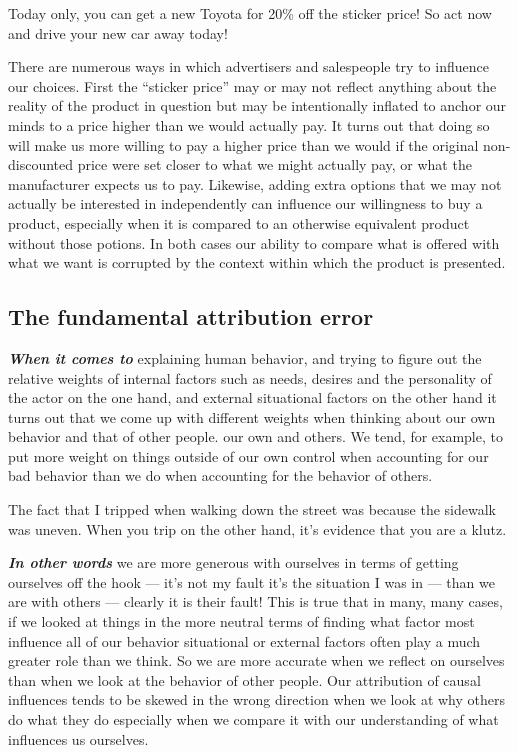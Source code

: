 \documentclass[]{book}
\makeatletter
\newenvironment{kframe}{%
\medskip{}
\setlength{\fboxsep}{.8em}
 \def\at@end@of@kframe{}%
 \ifinner\ifhmode%
  \def\at@end@of@kframe{\end{minipage}}%
  \begin{minipage}{\columnwidth}%
 \fi\fi%
 \def\FrameCommand##1{\hskip\@totalleftmargin \hskip-\fboxsep
 \colorbox{shadecolor}{##1}\hskip-\fboxsep
     \hskip-\linewidth \hskip-\@totalleftmargin \hskip\columnwidth}%
 \MakeFramed {\advance\hsize-\width
   \@totalleftmargin\z@ \linewidth\hsize
   \@setminipage}}%
 {\par\unskip\endMakeFramed%
 \at@end@of@kframe}
\newenvironment{rmdblock}[1]
  {
  \begin{itemize}
  \renewcommand{\labelitemi}{
    \raisebox{-.7\height}[0pt][0pt]{
      {\setkeys{Gin}{width=3em,keepaspectratio}\texttt{[image: img/\#1]}}
    }
  }
  \setlength{\fboxsep}{1em}
  \begin{kframe}
  \item
  }
  {
  \end{kframe}
  \end{itemize}
  }
\newenvironment{rmdwarning}
  {\begin{rmdblock}{warning}}
  {\end{rmdblock}}
\makeatother
\begin{document}
\begin{rmdwarning}
Today only, you can get a new Toyota for 20\% off the sticker price! So
act now and drive your new car away today!
\end{rmdwarning}

There are numerous ways in which advertisers and salespeople try to influence our choices. First the ``sticker price'' may or may not reflect anything about the reality of the product in question but may be intentionally inflated to anchor our minds to a price higher than we would actually pay. It turns out that doing so will make us more willing to pay a higher price than we would if the original non-discounted price were set closer to what we might actually pay, or what the manufacturer expects us to pay. Likewise, adding extra options that we may not actually be interested in independently can influence our willingness to buy a product, especially when it is compared to an otherwise equivalent product without those potions. In both cases our ability to compare what is offered with what we want is corrupted by the context within which the product is presented.

\hypertarget{the-fundamental-attribution-error}{%
\subsection*{The fundamental attribution error}\label{the-fundamental-attribution-error}}


\textbf{\emph{When it comes to}} explaining human behavior, and trying to figure out the relative weights of internal factors such as needs, desires and the personality of the actor on the one hand, and external situational factors on the other hand it turns out that we come up with different weights when thinking about our own behavior and that of other people. our own and others. We tend, for example, to put more weight on things outside of our own control when accounting for our bad behavior than we do when accounting for the behavior of others.

\begin{rmdwarning}
The fact that I tripped when walking down the street was because the
sidewalk was uneven. When you trip on the other hand, it's evidence that
you are a klutz.
\end{rmdwarning}

\textbf{\emph{In other words}} we are more generous with ourselves in terms of getting ourselves off the hook --- it's not my fault it's the situation I was in --- than we are with others --- clearly it is their fault! This is true that in many, many cases, if we looked at things in the more neutral terms of finding what factor most influence all of our behavior situational or external factors often play a much greater role than we think. So we are more accurate when we reflect on ourselves than when we look at the behavior of other people. Our attribution of causal influences tends to be skewed in the wrong direction when we look at why others do what they do especially when we compare it with our understanding of what influences us ourselves.
\end{document}

